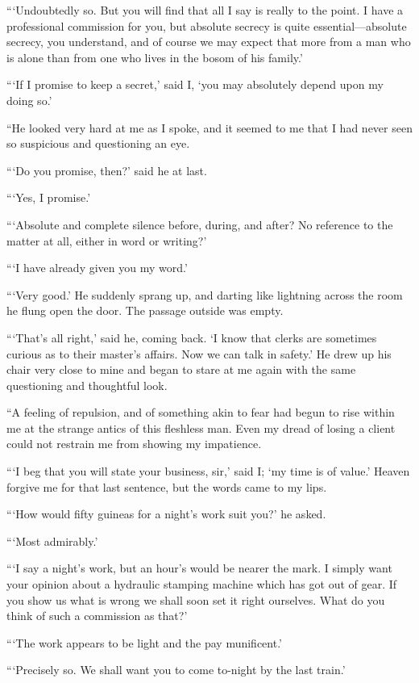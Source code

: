 \documentclass{article}
\begin{document}
```Undoubtedly so. But you will find that all I say is really to the
point. I have a professional commission for you, but absolute secrecy
is quite essential---absolute secrecy, you understand, and of course we
may expect that more from a man who is alone than from one who lives in
the bosom of his family.'

```If I promise to keep a secret,' said I, `you may absolutely depend
upon my doing so.'

``He looked very hard at me as I spoke, and it seemed to me that I had
never seen so suspicious and questioning an eye.

```Do you promise, then?' said he at last.

```Yes, I promise.'

```Absolute and complete silence before, during, and after? No reference
to the matter at all, either in word or writing?'

```I have already given you my word.'

```Very good.' He suddenly sprang up, and darting like lightning across
the room he flung open the door. The passage outside was empty.

```That's all right,' said he, coming back. `I know that clerks are
sometimes curious as to their master's affairs. Now we can talk in
safety.' He drew up his chair very close to mine and began to stare at
me again with the same questioning and thoughtful look.

``A feeling of repulsion, and of something akin to fear had begun to rise
within me at the strange antics of this fleshless man. Even my dread of
losing a client could not restrain me from showing my impatience.

```I beg that you will state your business, sir,' said I; `my time is
of value.' Heaven forgive me for that last sentence, but the words came
to my lips.

```How would fifty guineas for a night's work suit you?' he asked.

```Most admirably.'

```I say a night's work, but an hour's would be nearer the mark. I
simply want your opinion about a hydraulic stamping machine which has
got out of gear. If you show us what is wrong we shall soon set it right
ourselves. What do you think of such a commission as that?'

```The work appears to be light and the pay munificent.'

```Precisely so. We shall want you to come to-night by the last train.'
\end{document}
